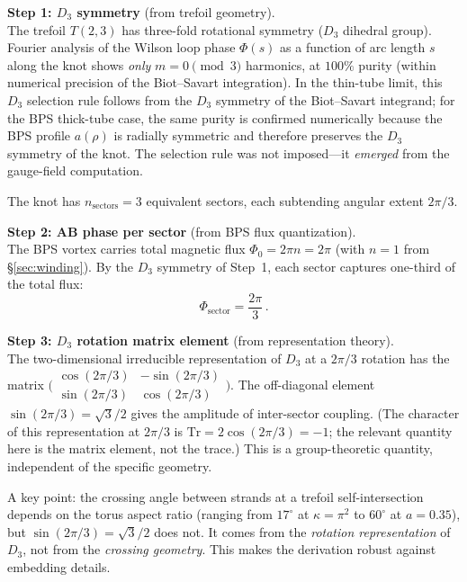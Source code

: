 \documentclass[11pt]{article}
\newcommand{\Tr}{\mathrm{Tr}}
\begin{document}
\medskip
\noindent\textbf{Step 1: $D_3$ symmetry} (from trefoil geometry).\\
The trefoil $T(2,3)$ has three-fold rotational symmetry ($D_3$
dihedral group).  Fourier analysis of the Wilson loop phase
$\Phi(s)$ as a function of arc length $s$ along the knot shows
\emph{only} $m = 0 \pmod{3}$ harmonics, at $100\%$ purity (within
numerical precision of the Biot--Savart integration).  In the
thin-tube limit, this $D_3$ selection rule follows from the
$D_3$ symmetry of the Biot--Savart integrand; for the
BPS thick-tube case, the same purity is confirmed numerically
because the BPS profile $a(\rho)$ is radially symmetric and
therefore preserves the $D_3$ symmetry of the knot.  The
selection rule was not imposed---it \emph{emerged} from the
gauge-field computation.

The knot has $n_\text{sectors} = 3$ equivalent sectors, each
subtending angular extent $2\pi/3$.

\medskip
\noindent\textbf{Step 2: AB phase per sector} (from BPS flux quantization).\\
The BPS vortex carries total magnetic flux
$\Phi_0 = 2\pi n = 2\pi$ (with $n = 1$ from \S\ref{sec:winding}).
By the $D_3$ symmetry of Step~1, each sector captures one-third
of the total flux:
\[
\Phi_\text{sector} = \frac{2\pi}{3}\,.
\]

\medskip
\noindent\textbf{Step 3: $D_3$ rotation matrix element} (from
representation theory).\\
The two-dimensional irreducible representation of $D_3$ at a
$2\pi/3$ rotation has the matrix
$\bigl(\begin{smallmatrix}\cos(2\pi/3) & -\sin(2\pi/3)\\
\sin(2\pi/3) & \cos(2\pi/3)\end{smallmatrix}\bigr)$.
The off-diagonal element $\sin(2\pi/3) = \sqrt{3}/2$ gives the
amplitude of inter-sector coupling.  (The character of this
representation at $2\pi/3$ is $\Tr = 2\cos(2\pi/3) = -1$; the
relevant quantity here is the matrix element, not the trace.)
This is a group-theoretic quantity, independent of the specific
geometry.

A key point: the crossing angle between strands at a trefoil
self-intersection depends on the torus aspect ratio (ranging from
$17^\circ$ at $\kappa = \pi^2$ to $60^\circ$ at $a = 0.35$), but
$\sin(2\pi/3) = \sqrt{3}/2$ does not.  It comes from the
\emph{rotation representation} of $D_3$, not from the
\emph{crossing geometry}.  This makes the derivation robust against embedding
details.
\end{document}
